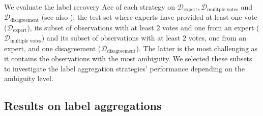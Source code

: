 We evaluate the label recovery $\mathrm{Acc}$ of each strategy on $\mathcal{D}_\text{expert}, \mathcal{D}_{\text{mulitple votes}}$ and $\mathcal{D}_{\text{disagreement}}$ (see also ): the test set where experts have provided at least one vote ($\mathcal{D}_\text{expert}$), its subset of observations with at least $2$ votes and one from an expert ($\mathcal{D}_\text{multiple votes}$) and its subset of observations with at least $2$ votes, one from an expert, and one disagreement ($\mathcal{D}_\text{disagreement}$).
The latter is the most challenging as it contains the observations with the most ambiguity.
We selected these subsets to investigate the label aggregation strategies' performance depending on the ambiguity level.

\subsection{Results on label aggregations}
\label{sub:plantnet_res_aggregations}


